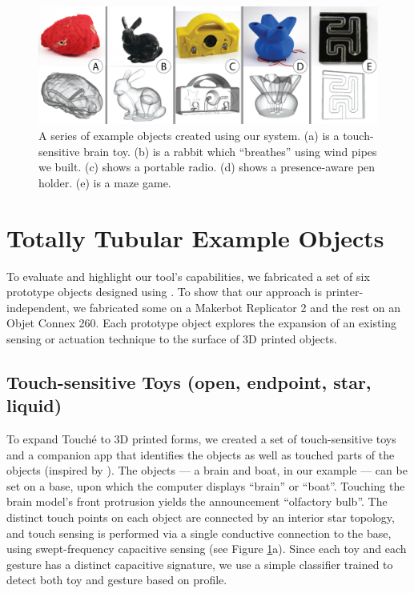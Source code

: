 \begin{figure}
\centering
    \includegraphics[width=7in]{figures/examples.png}
\caption{A series of example objects created using our system.  (a) is a touch-sensitive brain toy.  (b) is a rabbit which ``breathes'' using wind pipes we built.  (c) shows a portable radio.  (d) shows a presence-aware pen holder.  (e) is a maze game.}
\label{fig:examples}
\end{figure}

\section{Totally Tubular Example Objects}
To evaluate and highlight our tool's capabilities, we fabricated a set of six prototype objects designed using \systemnamenospace.  To show that our approach is printer-independent, we fabricated some on a Makerbot Replicator 2 and the rest on an Objet Connex 260.  Each prototype object explores the expansion of an existing sensing or actuation technique to the surface of 3D printed objects.

\subsection{Touch-sensitive Toys (open, endpoint, star, liquid)}

To expand Touch\'{e} \cite{Sato-touche} to 3D printed forms, we created a set of touch-sensitive toys and a companion app that identifies the objects as well as touched parts of the objects (inspired by \cite{Harrison-acoustic}). The objects --- a brain and boat, in our example --- can be set on a base, upon which the computer displays ``brain'' or ``boat''. Touching the brain model's front protrusion yields the announcement ``olfactory bulb''. The distinct touch points on each object are connected by an interior star topology, and touch sensing is performed via a single conductive connection to the base, using swept-frequency capacitive sensing (see Figure \ref{fig:examples}a). %
Since each toy and each gesture has a distinct capacitive signature, we use a simple classifier trained to detect both toy and gesture based on profile.

